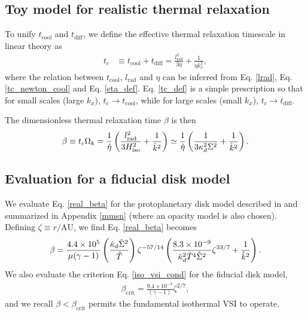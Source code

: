 \subsection{Toy model for realistic thermal relaxation}
To unify $t_\mathrm{cool}$ and $t_\mathrm{diff}$, we define the
effective thermal relaxation timescale in linear theory as
\begin{align}\label{tc_def}
  t_c &\equiv t_\mathrm{cool} + t _\mathrm{diff} =
  \frac{l_\mathrm{rad}^2}{3\eta} + \frac{1}{\eta k_x^2},  
\end{align}
where the relation between $t_\mathrm{cool}$, $l_\mathrm{rad}$ and
$\eta$ can be inferred from Eq. \ref{lrad}, Eq. \ref{tc_newton_cool}
and Eq. \ref{eta_def}. Eq. \ref{tc_def} is a simple prescription so
that for small scales (large $k_x$), $t_c\to t_\mathrm{cool}$, while
for large scales (small $k_x$), $t_c\to t_\mathrm{diff}$. 

The dimensionless thermal relaxation time $\beta$ is then
\begin{align}\label{real_beta}
  \beta \equiv t_c\Omega_k =
  \frac{1}{\hat{\eta}}\left(\frac{l_\mathrm{rad}^2}{3H_\mathrm{iso}^2}
    + \frac{1}{\hat{k}^2}\right)  \simeq
  \frac{1}{\hat{\eta}}\left(\frac{1}{3\kappa_d^2\Sigma^2} 
    + \frac{1}{\hat{k}^2}\right).
\end{align}

\subsection{Evaluation for a fiducial disk model}
We evaluate Eq. \ref{real_beta} for the protoplanetary disk model
described in \cite{chiang10} and summarized in Appendix \ref{mmsn}
(where an opacity model is also chosen). Defining $\zeta\equiv
r/\mathrm{AU}$, we find Eq. \ref{real_beta} becomes
\begin{align}\label{beta_mmsn}
\beta =
\frac{4.4\times10^5}{\mu(\gamma-1)}\left(\frac{\hat{\kappa}_d\hat{\Sigma}^2}{\hat{T}}\right)\zeta^{-57/14}\left(\frac{8.3\times10^{-9}}{\hat{\kappa}_d^2\hat{T}^4\hat{\Sigma}^2}\zeta^{33/7}+\frac{1}{\hat{k}^2}\right).  
\end{align}
We also evaluate the criterion Eq. \ref{iso_vsi_cond} for the fiducial
disk model, 
\begin{align}\label{bcrit_mmsn}
  \beta_\mathrm{crit} = \frac{9.4\times10^{-3}}{(\gamma
    -1)}\zeta^{2/7},
\end{align}
and we recall $\beta < \beta_\mathrm{crit}$ permits the fundamental 
isothermal VSI to operate. 

